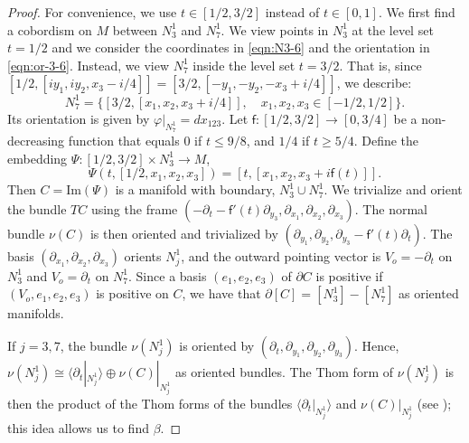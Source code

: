 \documentclass[10pt]{article}
\newcommand{\la}{\langle}
\newcommand{\ra}{\rangle}
\theoremstyle{plain}
\theoremstyle{definition}
\theoremstyle{remark}
\begin{document}
\begin{proof}
For convenience, we use $t\in [1/2,3/2]$ instead of $t\in [0,1]$. We first find a cobordism on $M$ between $N_3^1$ and $N_7^1$. We view points in $N_3^1$ at the level set $t=1/2$ and we consider the coordinates in \eqref{eqn:N3-6} and the orientation in \eqref{eqn:or-3-6}. Instead, we view $N_7^1$ inside the level set $t=3/2$. That is, since
$[1/2,[iy_1,iy_2,x_3- i/4]]= [3/2,[-y_1,-y_2,-x_3+i/4]]$, we describe:
\begin{equation} \label{eqn:N7-1-new}
N_7^1=\{ [3/2,[x_1,x_2,x_3 + i/4]], \quad x_1,x_2,x_3 \in [-1/2,1/2] \}.
\end{equation}
Its orientation is given by $\varphi|_{N_7^1}=dx_{123}$.
Let $\mathsf{f}\colon [1/2,3/2]\to [0,3/4]$ be a non-decreasing function that equals $0$ if $t\leq 9/8$, and $1/4$ if $t\geq 5/4$. Define the embedding $\Psi\colon [1/2, 3/2] \times N_3^1 \to M$,
\begin{equation} \label{eqn:cob}
\Psi (t,[1/2,x_1,x_2,x_3])=[t,[x_1,x_2,x_3 + i\mathsf{f}(t)]].
\end{equation}
Then $C=\mathrm{Im}(\Psi)$ is a manifold with boundary, $ N_3^1\cup N_7^1$. We trivialize and orient the bundle $TC$ using the frame $(-\partial_t- \mathsf{f}'(t)\partial_{y_3}, \partial_{x_1}, \partial_{x_2}, \partial_{x_3} )$. The normal bundle $\nu(C)$ is then oriented and trivialized by 
$(\partial_{y_1}, \partial_{y_2}, \partial_{y_3}- \mathsf{f}'(t)\partial_{t})$. The basis $(\partial_{x_1}, \partial_{x_2}, \partial_{x_3})$ orients $N_j^1$, and the outward pointing vector is $V_o=-\partial_t$ on $N_3^1$ and $V_o=\partial_t$ on $N_7^1$. Since a basis $(e_1,e_2,e_3)$ of $\partial C$ is positive if $(V_o,e_1,e_2,e_3)$ is positive on $C$, we have that
$\partial[{C}]=[N_3^1] - [N_7^1]$ as oriented manifolds.

If $j=3,7$, the bundle $\nu(N_j^1)$ is oriented by $(\partial_t,\partial_{y_1},\partial_{y_2},\partial_{y_3})$. Hence, $\nu(N_j^1)\cong \la \partial_t|_{N_j^1} \ra \oplus \nu(C)|_{N_j^1}$ as oriented bundles. The Thom form of $\nu(N_j^1)$ is then the product of the Thom forms of the bundles $\la \partial_t|_{N_j^1}  \ra$ and $\nu(C)|_{N_j^1}$ (see \cite[Proposition 6.19]{Bott-Tu}); this idea allows us to find $\beta$. 


\end{proof}
\end{document}
